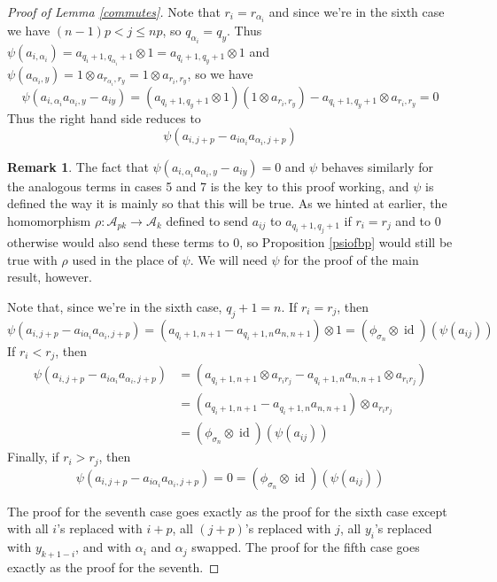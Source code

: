 \documentclass[11pt]{amsart}
\def\ltblue{blue!20!white}
\def\A{{\mathcal A}}
\def\s{{\sigma}}
\def\a{\alpha}
\newcommand\id{\operatorname{id}}
\theoremstyle{definition}
\newtheorem{rem}[thm]{Remark}
\begin{document}
\begin{proof} [Proof of Lemma \ref{commutes}]
Note that $r_i = r_{\a_i}$ and since we're in the sixth case we have $(n-1)p<j\le np$, so $q_{\a_i}=q_y$.  Thus $\psi(a_{i,\a_i}) = a_{q_i+1,q_{\a_i}+1}\otimes 1 = a_{q_i+1,q_y+1}\otimes 1$ and $\psi(a_{\a_i,y}) = 1\otimes a_{r_{\a_i},r_y} = 1\otimes a_{r_i,r_y}$, so we have
$$\psi(a_{i,\a_i}a_{\a_i,y} - a_{iy}) = \left(a_{q_i+1,q_y+1}\otimes 1\right)\left(1\otimes a_{r_i,r_y}\right) - a_{q_i+1,q_y+1}\otimes a_{r_i,r_y} = 0$$
Thus the right hand side reduces to 
$$\psi\left(a_{i,j+p} - a_{i\a_i}a_{\a_i,j+p}\right)$$

\begin{rem}
The fact that $\psi(a_{i,\a_i}a_{\a_i,y} - a_{iy}) = 0$ and $\psi$ behaves similarly for the analogous terms in cases 5 and 7 is the key to this proof working, and $\psi$ is defined the way it is mainly so that this will be true.  As we hinted at earlier, the homomorphism $\rho\colon \A_{pk}\rightarrow \A_k$ defined to send $a_{ij}$ to $a_{q_i+1,q_j+1}$ if $r_i=r_j$ and to 0 otherwise would also send these terms to 0, so Proposition \ref{psiofbp} would still be true with $\rho$ used in the place of $\psi$.  We will need $\psi$ for the proof of the main result, however.
\end{rem}

\noindent Note that, since we're in the sixth case, $q_j + 1 = n$.  If $r_i = r_j$, then 
$$\psi\left(a_{i,j+p} - a_{i\a_i}a_{\a_i,j+p}\right) = \left(a_{q_i+1,n+1} - a_{q_i+1,n}a_{n,n+1}\right)\otimes 1 = (\phi_{\s_n} \otimes \id)(\psi(a_{ij}))$$
If $r_i < r_j$, then
\begin{align*}
\psi\left(a_{i,j+p} - a_{i\a_i}a_{\a_i,j+p}\right) &= \left(a_{q_i+1,n+1}\otimes a_{r_ir_j} - a_{q_i+1,n}a_{n,n+1}\otimes a_{r_ir_j}\right)\\
&= \left(a_{q_i+1,n+1} - a_{q_i+1,n}a_{n,n+1}\right)\otimes a_{r_ir_j}\\
&= (\phi_{\s_n} \otimes \id)(\psi(a_{ij}))
\end{align*}
Finally, if $r_i > r_j$, then
$$\psi\left(a_{i,j+p} - a_{i\a_i}a_{\a_i,j+p}\right) = 0 = (\phi_{\s_n} \otimes \id)(\psi(a_{ij}))$$

The proof for the seventh case goes exactly as the proof for the sixth case except with all $i$'s replaced with $i+p$, all $(j+p)$'s replaced with $j$, all $y_i$'s replaced with $y_{k+1-i}$, and with $\a_i$ and $\a_j$ swapped.  The proof for the fifth case goes exactly as the proof for the seventh.\todo[color=\ltblue]{check this}
\end{proof}
\end{document}
